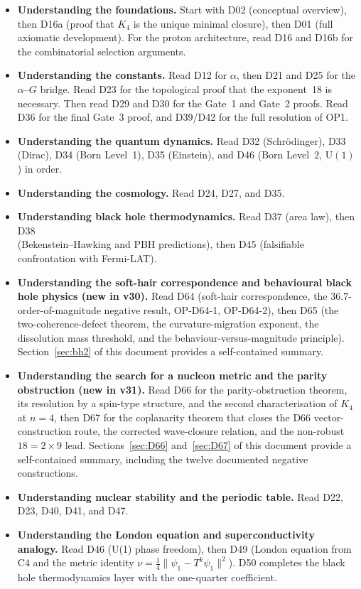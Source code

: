 \documentclass[11pt,a4paper]{article}
\theoremstyle{plain}
\theoremstyle{definition}
\theoremstyle{remark}
\begin{document}
\begin{itemize}
\item \textbf{Understanding the foundations.} Start with D02 (conceptual overview), then D16a (proof that $K_4$ is the unique minimal closure), then D01 (full axiomatic development). For the proton architecture, read D16 and D16b for the combinatorial selection arguments.
\item \textbf{Understanding the constants.} Read D12 for $\alpha$, then D21 and D25 for the $\alpha$--$G$ bridge. Read D23 for the topological proof that the exponent~18 is necessary. Then read D29 and D30 for the Gate~1 and Gate~2 proofs. Read D36 for the final Gate~3 proof, and D39/D42 for the full resolution of OP1.
\item \textbf{Understanding the quantum dynamics.} Read D32 (Schr\"odinger), D33 (Dirac), D34 (Born Level~1), D35 (Einstein), and D46 (Born Level~2, $\mathrm{U}(1)$) in order.
\item \textbf{Understanding the cosmology.} Read D24, D27, and D35.
\item \textbf{Understanding black hole thermodynamics.} Read D37 (area law), then D38 \\ (Bekenstein--Hawking and PBH predictions), then D45 (falsifiable confrontation with Fermi-LAT).
\item \textbf{Understanding the soft-hair correspondence and behavioural black hole physics (new in v30).} Read D64 (soft-hair correspondence, the $36.7$-order-of-magnitude negative result, OP-D64-1, OP-D64-2), then D65 (the two-coherence-defect theorem, the curvature-migration exponent, the dissolution mass threshold, and the behaviour-versus-magnitude principle). Section~\ref{sec:bh2} of this document provides a self-contained summary.
\item \textbf{Understanding the search for a nucleon metric and the parity obstruction (new in v31).} Read D66 for the parity-obstruction theorem, its resolution by a spin-type structure, and the second characterisation of $K_4$ at $n=4$, then D67 for the coplanarity theorem that closes the D66 vector-construction route, the corrected wave-closure relation, and the non-robust $18=2\times9$ lead. Sections~\ref{sec:D66} and~\ref{sec:D67} of this document provide a self-contained summary, including the twelve documented negative constructions.
\item \textbf{Understanding nuclear stability and the periodic table.} Read D22, D23, D40, D41, and D47.
\item \textbf{Understanding the London equation and superconductivity analogy.} Read D46 (U(1) phase freedom), then D49 (London equation from C4 and the metric identity $\nu = \tfrac{1}{4}\|\psi_1 - T^k\psi_1\|^2$). D50 completes the black hole thermodynamics layer with the one-quarter coefficient.

\end{itemize}
\end{document}
